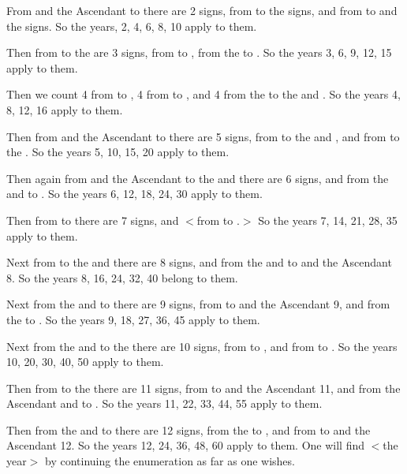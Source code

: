 From \Mars\xspace and the Ascendant to \Jupiter\xspace there are 2 signs, from \Jupiter\xspace to the \Moon\xspace 2 signs, and from \Venus\xspace to \Mercury\xspace and the \Sun\xspace 2 signs. So the years, 2, 4, 6, 8, 10 apply to them.

Then from \Mars\xspace to the \Moon\xspace are 3 signs, from \Saturn\xspace to \Mars\xspace 3, from the \Moon\xspace to \Venus\xspace 3. So the years 3, 6, 9, 12, 15 apply to them.

Then we count 4 from \Saturn\xspace to \Jupiter, 4 from \Jupiter\xspace to \Venus, and 4 from the \Moon\xspace to the \Sun\xspace and \Mercury. So the years 4, 8, 12, 16 apply to them.

Then from \Mars\xspace and the Ascendant to \Venus\xspace there are 5 signs, from \Jupiter\xspace to the \Sun\xspace and \Mercury\xspace 5, and from \Saturn\xspace to the \Moon\xspace 5. So the years 5, 10, 15, 20 apply to them.

Then again from \Mars\xspace and the Ascendant to the \Sun\xspace and \Mercury\xspace there are 6 signs, and from the \Sun\xspace
and \Mercury\xspace to \Saturn\xspace 6. So the years 6, 12, 18, 24, 30 apply to them.

Then from \Saturn\xspace to \Venus\xspace there are 7 signs, and $<$from \Venus\xspace to \Saturn\xspace 7.$>$ So the years 7, 14, 21, 28, 35 apply to them.

Next from \Saturn\xspace to the \Sun\xspace and \Mercury\xspace there are 8 signs, and from the \Sun\xspace and \Mercury\xspace to \Mars\xspace and the Ascendant 8. So the years 8, 16, 24, 32, 40 belong to them.

Next from the \Sun\xspace and \Mercury\xspace to \Jupiter\xspace there are 9 signs, from \Venus\xspace to \Mars\xspace and the Ascendant 9, and from the \Moon\xspace to \Saturn\xspace 9. So the years 9, 18, 27, 36, 45 apply to them.

Next from the \Sun\xspace and \Mercury\xspace to the \Moon\xspace there are 10 signs, from \Venus\xspace to \Jupiter\xspace 10, and from \Jupiter\xspace to \Saturn\xspace 10. So the years 10, 20, 30, 40, 50 apply to them.

Then from \Venus\xspace to the \Moon\xspace there are 11 signs, from \Moon\xspace to \Mars\xspace and the Ascendant 11, and
from the Ascendant and \Mars\xspace to \Saturn\xspace 11. So the years 11, 22, 33, 44, 55 apply to them.

Then from the \Sun\xspace and \Mercury\xspace to \Venus\xspace there are 12 signs, from the \Moon\xspace to \Jupiter\xspace 12, and from \Jupiter\xspace to \Mars\xspace and the Ascendant 12. So the years 12, 24, 36, 48, 60 apply to them. One will find $<$the year$>$ by continuing the enumeration as far as one wishes.

